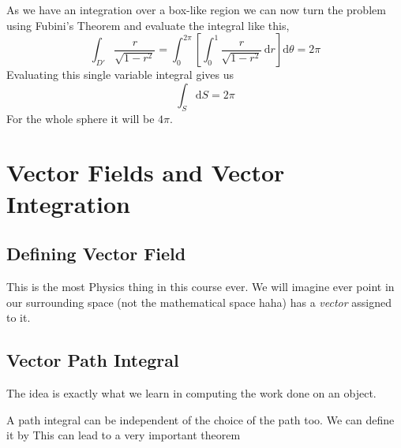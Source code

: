 \documentclass[letter]{article}
\begin{document}
{{As we have an integration over a box-like region we can now turn the problem using Fubini's Theorem and evaluate the integral like this, 
\[
 \int_{D'}^{}  \frac{r}{\sqrt{1 - r^2} } = \int_{0}^{2\pi } 
	\left[ 
	\int_{0}^{1} \frac{r}{\sqrt{1 - r^2} } \, \mathrm{d}  r 
	\right] \mathrm{d} \theta = 2 \pi 
\] 
Evaluating this single variable integral gives us
\[
\int_{S}^{} \mathrm{d} S = 2 \pi  
\]
For the whole sphere it will be $4 \pi $. 
}


\newpage
\section*{Vector Fields and Vector Integration} 
\subsection*{Defining Vector Field}
\textsf{This is the most Physics thing in this course ever. We will imagine ever point in our surrounding space (not the mathematical space haha) has a \emph{vector }assigned to it. }

\subsection*{Vector Path Integral} 
\textsf{The idea is exactly what we learn in computing the work done on an object.}

A path integral can be independent of the choice of the path too. We can define it by 
This can lead to a very important theorem 

}
\end{document}
